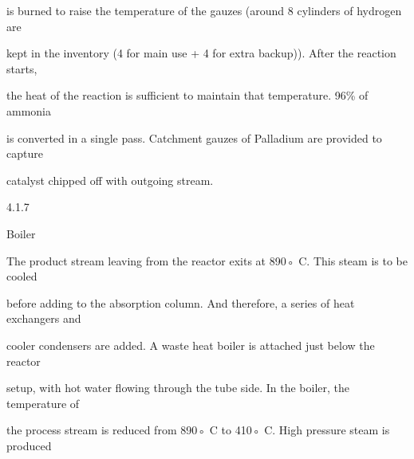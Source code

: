\documentclass[a4paper,portrait,12pt]{article}
\begin{document}
\begin{flushleft}
is burned to raise the temperature of the gauzes (around 8 cylinders of hydrogen are
\end{flushleft}


\begin{flushleft}
kept in the inventory (4 for main use + 4 for extra backup)). After the reaction starts,
\end{flushleft}


\begin{flushleft}
the heat of the reaction is sufficient to maintain that temperature. 96\% of ammonia
\end{flushleft}


\begin{flushleft}
is converted in a single pass. Catchment gauzes of Palladium are provided to capture
\end{flushleft}


\begin{flushleft}
catalyst chipped off with outgoing stream.
\end{flushleft}





4.1.7





\begin{flushleft}
Boiler
\end{flushleft}





\begin{flushleft}
The product stream leaving from the reactor exits at 890◦ C. This steam is to be cooled
\end{flushleft}


\begin{flushleft}
before adding to the absorption column. And therefore, a series of heat exchangers and
\end{flushleft}


\begin{flushleft}
cooler condensers are added. A waste heat boiler is attached just below the reactor
\end{flushleft}


\begin{flushleft}
setup, with hot water flowing through the tube side. In the boiler, the temperature of
\end{flushleft}


\begin{flushleft}
the process stream is reduced from 890◦ C to 410◦ C. High pressure steam is produced
\end{flushleft}
\end{document}
